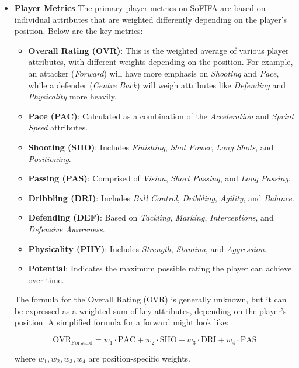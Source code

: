 \begin{itemize}

\item \textbf{Player Metrics}
    The primary player metrics on SoFIFA are based on individual attributes that are weighted differently depending on the player's position. Below are the key metrics:
    
    \begin{itemize}
        \item \textbf{Overall Rating (OVR)}: This is the weighted average of various player attributes, with different weights depending on the position. For example, an attacker (\textit{Forward}) will have more emphasis on \textit{Shooting} and \textit{Pace}, while a defender (\textit{Centre Back}) will weigh attributes like \textit{Defending} and \textit{Physicality} more heavily.
        \item \textbf{Pace (PAC)}: Calculated as a combination of the \textit{Acceleration} and \textit{Sprint Speed} attributes.
        \item \textbf{Shooting (SHO)}: Includes \textit{Finishing}, \textit{Shot Power}, \textit{Long Shots}, and \textit{Positioning}.
        \item \textbf{Passing (PAS)}: Comprised of \textit{Vision}, \textit{Short Passing}, and \textit{Long Passing}.
        \item \textbf{Dribbling (DRI)}: Includes \textit{Ball Control}, \textit{Dribbling}, \textit{Agility}, and \textit{Balance}.
        \item \textbf{Defending (DEF)}: Based on \textit{Tackling}, \textit{Marking}, \textit{Interceptions}, and \textit{Defensive Awareness}.
        \item \textbf{Physicality (PHY)}: Includes \textit{Strength}, \textit{Stamina}, and \textit{Aggression}.
        \item \textbf{Potential}: Indicates the maximum possible rating the player can achieve over time.
    \end{itemize}
    
    The formula for the Overall Rating (OVR) is generally unknown, but it can be expressed as a weighted sum of key attributes, depending on the player’s position. A simplified formula for a forward might look like:
    
    \[
    \text{OVR}_{\text{Forward}} = w_1 \cdot \text{PAC} + w_2 \cdot \text{SHO} + w_3 \cdot \text{DRI} + w_4 \cdot \text{PAS}
    \]
    
    where \( w_1, w_2, w_3, w_4 \) are position-specific weights.


\end{itemize}
